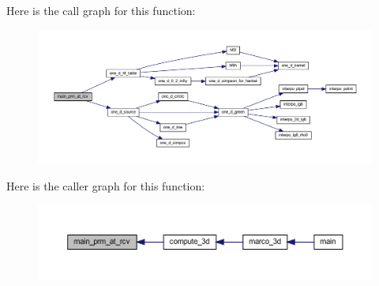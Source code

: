 Here is the call graph for this function\+:
\nopagebreak
\begin{figure}[H]
\begin{center}
\leavevmode
\includegraphics[width=350pt]{Marco_8f90_adfc6a7cb71bd4ea9c02eaafd4d9e5664_cgraph}
\end{center}
\end{figure}
Here is the caller graph for this function\+:
\nopagebreak
\begin{figure}[H]
\begin{center}
\leavevmode
\includegraphics[width=350pt]{Marco_8f90_adfc6a7cb71bd4ea9c02eaafd4d9e5664_icgraph}
\end{center}
\end{figure}
\mbox{\label{Marco_8f90_a631581f8c126c181d87636784b2f6720}} 
